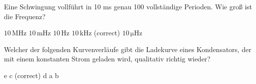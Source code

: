 \documentclass[11pt]{exam}
\begin{document}
\begin{questions}
\vspace{3mm}\question Eine Schwingung vollführt in 10 ms genau 100 vollständige Perioden. Wie groß ist die Frequenz?

\begin{choices}
	\choice \(\mathrm{10\,MHz}\)
	\choice \(\mathrm{10\,mHz}\)
	\choice \(\mathrm{10\,Hz}\)
	\choice \(\mathrm{10\,kHz}\) (correct)
	\choice \(\mathrm{10\,\mu Hz}\)
\end{choices}

\vspace{3mm}\question Welcher der folgenden Kurvenverläufe gibt die Ladekurve eines Kondensators, der mit einem konstanten Strom geladen wird, qualitativ richtig wieder?

\begin{choices}
	\choice e
	\choice c (correct)
	\choice d
	\choice a
	\choice b
\end{choices}

\vspace{3mm}\end{questions}
\end{document}
